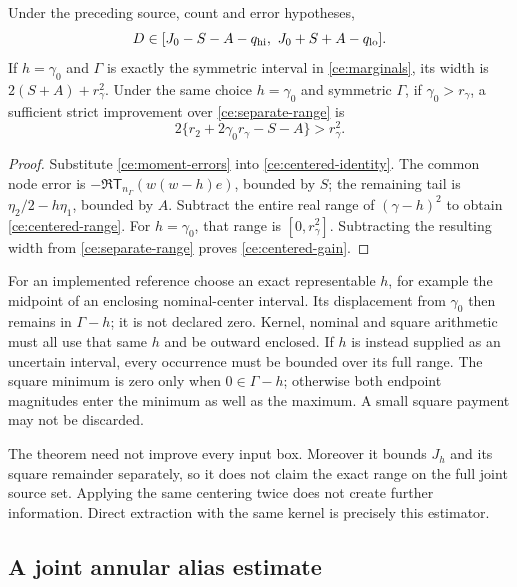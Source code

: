 \begin{theorem}
\label{ce:centered}
Under the preceding source, count and error hypotheses,
\begin{equation}
 D\in[J_0-S-A-q_{\rm hi},\ J_0+S+A-q_{\rm lo}].
 \label{ce:centered-range}
\end{equation}
If $h=\gamma_0$ and $\Gamma$ is exactly the symmetric interval in
\eqref{ce:marginals}, its width is $2(S+A)+r_\gamma^2$.
Under the same choice $h=\gamma_0$ and symmetric $\Gamma$, if
$\gamma_0>r_\gamma$, a sufficient strict improvement over
\eqref{ce:separate-range} is
\begin{equation}
 2\{r_2+2\gamma_0r_\gamma-S-A\}>r_\gamma^2.
 \label{ce:centered-gain}
\end{equation}
\end{theorem}
\begin{proof}
Substitute \eqref{ce:moment-errors} into
\eqref{ce:centered-identity}. The common node error is
$-\Re\mathsf T_{n_\Gamma}(w(w-h)e)$, bounded by $S$; the remaining
tail is $\eta_2/2-h\eta_1$, bounded by $A$. Subtract the entire real
range of $(\gamma-h)^2$ to obtain \eqref{ce:centered-range}.
For $h=\gamma_0$, that range is $[0,r_\gamma^2]$.
Subtracting the resulting width from \eqref{ce:separate-range} proves
\eqref{ce:centered-gain}.
\end{proof}

For an implemented reference choose an exact representable $h$, for
example the midpoint of an enclosing nominal-center interval. Its
displacement from $\gamma_0$ then remains in $\Gamma-h$; it is not
declared zero. Kernel, nominal and square arithmetic must all use that
same $h$ and be outward enclosed. If $h$ is instead supplied as an
uncertain interval, every occurrence must be bounded over its full
range. The square minimum is zero only when $0\in\Gamma-h$;
otherwise both endpoint magnitudes enter the minimum as well as the
maximum. A small square payment may not be discarded.

The theorem need not improve every input box. Moreover it bounds $J_h$
and its square remainder separately, so it does not claim the exact
range on the full joint source set. Applying the same centering twice
does not create further information. Direct extraction with the same
kernel is precisely this estimator.

\subsection{A joint annular alias estimate}


